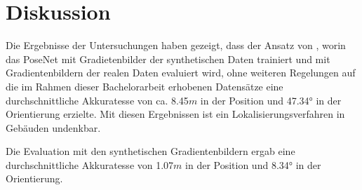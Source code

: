 
\section{Diskussion}
\label{sec:kapitel_5}

Die Ergebnisse der Untersuchungen haben gezeigt, dass der Ansatz von \citet{acharyaBIMPoseNetIndoorCamera2019}, worin das PoseNet mit Gradietenbilder der synthetischen Daten trainiert und mit Gradientenbildern der realen Daten evaluiert wird,  ohne weiteren Regelungen auf die im Rahmen dieser Bachelorarbeit erhobenen Datensätze eine durchschnittliche Akkuratesse von ca. 8.45$m$ in der Position und 47.34° in der Orientierung erzielte. Mit diesen Ergebnissen ist ein Lokalisierungsverfahren in Gebäuden undenkbar.

Die Evaluation mit den synthetischen Gradientenbildern ergab eine durchschnittliche Akkuratesse von 1.07$m$ in der Position und 8.34° in der Orientierung.


% 




